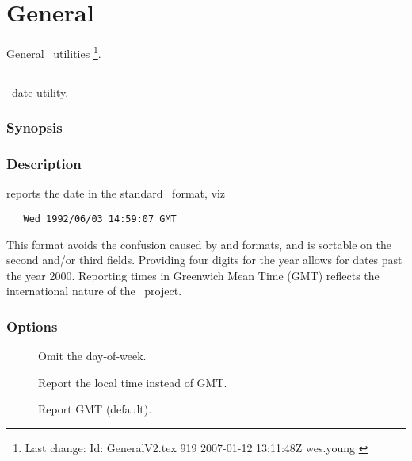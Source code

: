 \chapter{General}
\label{General}

General \aipspp\ utilities \footnote{Last change:
$ $Id: GeneralV2.tex 919 2007-01-12 13:11:48Z wes.young $ $}.


\section{}
\label{adate}

\aipspp\ date utility.

\subsection*{Synopsis}

\begin{synopsis}
\end{synopsis}

\subsection*{Description}

 reports the date in the standard \aipspp\ format, viz

\begin{verbatim}
   Wed 1992/06/03 14:59:07 GMT
\end{verbatim}

\noindent
This format avoids the confusion caused by  and 
formats, and is sortable on the second and/or third fields.  Providing four
digits for the year allows for dates past the year 2000.  Reporting times in
Greenwich Mean Time (GMT) reflects the international nature of the \aipspp\ 
project.

\subsection*{Options}

\begin{description}
\item[]
   Omit the day-of-week.

\item[]
   Report the local time instead of GMT.

\item[]
   Report GMT (default).
\end{description}

